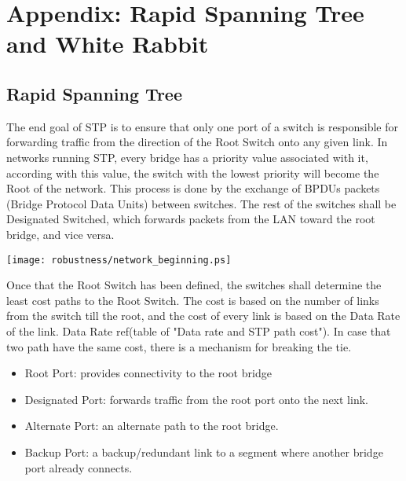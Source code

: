 \chapter{Appendix: Rapid Spanning Tree and White Rabbit}
\label{appD}

\section{Rapid Spanning Tree}

The end goal of STP is to ensure that only one port of a switch is responsible 
for forwarding traffic from the direction of the Root Switch onto any given
link. In networks running STP, every bridge has a priority value associated with
it, according with this value, the switch with the lowest priority will become
the Root of the network.  This process is done by the exchange of BPDUs packets
(Bridge Protocol Data Units) between switches. The rest of the switches shall be
Designated Switched, which forwards packets from the LAN toward the root bridge,
and vice versa.

\begin{center}
        \texttt{[image: robustness/network\_beginning.ps]}
        \label{fig:redunt_net}
\end{center}


Once that the Root Switch has been defined, the switches shall determine
the least cost paths to the Root Switch. The cost is based on the number of
links from the switch till the root, and the cost of every link is based on the
Data Rate of the link. Data Rate ref(table of "Data rate and STP path cost"). In
case that two path have the same cost, there is a mechanism for breaking the
tie.

\begin{itemize}
        \item Root Port: provides connectivity to the root bridge
        \item Designated Port: forwards traffic from the root port onto the
next link.
        \item Alternate Port: an alternate path to the root bridge.
        \item Backup Port: a backup/redundant link to a segment where
another bridge port already connects.
\end{itemize}


